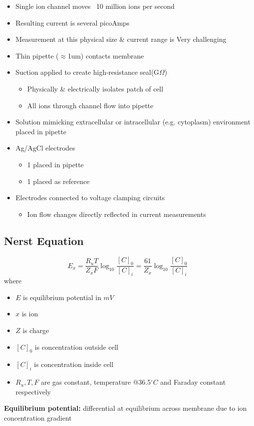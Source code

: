\documentclass[11pt,fleqn]{book} %
\begin{document}
\begin{itemize}
    \item Single ion channel moves ~10 million ions per second
    \item Resulting current is several picoAmps
    \item Measurement at this physical size \& current range is Very challenging
    \item Thin pipette ($\approx$1um) contacts membrane
    \item Suction applied to create high-resistance seal(G$\Omega$)
    \begin{itemize}
        \item Physically \& electrically isolates patch of cell
        \item All ions through channel flow into pipette
    \end{itemize}
    \item Solution mimicking extracellular or intracellular (e.g. cytoplasm) environment placed in pipette
    \item Ag/AgCl electrodes
    \begin{itemize}
        \item 1 placed in pipette
        \item 1 placed as reference
    \end{itemize}
    \item Electrodes connected to voltage clamping circuits
    \begin{itemize}
        \item Ion flow changes directly reflected in current measurements
    \end{itemize}
\end{itemize}

\subsection{Nerst Equation}
\begin{theorem}
    $$E_x=\frac{R_uT}{Z_xF}\log_{10}\frac{[C]_0}{[C]_i}=\frac{61}{Z_x}\log_{10}\frac{[C]_0}{[C]_i}$$
    where
    \begin{itemize}
        \item $E$ is equilibrium potential in $mV$
        \item $x$ is ion
        \item $Z$ is charge
        \item $[C]_0$ is concentration outside cell
        \item $[C]_i$ is concentration inside cell
        \item $R_u,T,F$ are gas constant, temperature @36.5$^\circ C$ and Faraday constant respectively
    \end{itemize}
    \textbf{Equilibrium potential:} differential at equilibrium across membrane due to ion concentration gradient
\end{theorem}
\end{document}
